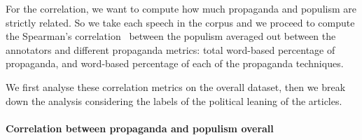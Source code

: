 For the correlation, we want to compute how much propaganda and populism are strictly related. So we take each speech in the corpus and we proceed to compute the Spearman's correlation~\citep{spearman1910correlation} between the  populism averaged out between the annotators and different propaganda metrics: total word-based percentage of propaganda, and word-based percentage of each of the propaganda techniques. 

We first analyse these correlation metrics on the overall dataset, then we break down the analysis considering the labels of the political leaning of the articles.


\paragraph{Correlation between propaganda and populism overall}





